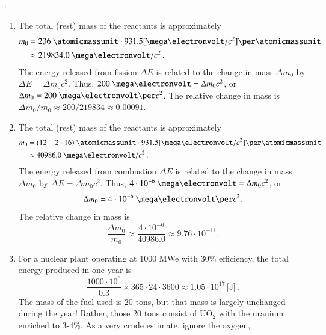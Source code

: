 \vspace{0.5cm}
\ifsolved
{
\color{purple}

:

\begin{enumerate}[label=(\alph*)]
\item The total (rest) mass of the reactants is approximately
      \begin{equation*}
      \begin{aligned}
       m_0
       &=236~\atomicmassunit\cdot
         931.5 [\mega\electronvolt/c^2]\per\atomicmassunit\\
       &\approx219834.0~\mega\electronvolt/c^2 \, .
      \end{aligned}
      \end{equation*}
       The energy released from fission $\Delta E$ is related to the change in mass $\Delta m_0$ by $\Delta E = \Delta m_0 c^2$.  Thus, $200~\mega\electronvolt = \Delta m_0 c^2$, or $\Delta m_0 = 200~ \mega\electronvolt\per c^2$.  The relative change in mass is $\Delta m_0 / m_0 \approx 200/219834 \approx \boxed{0.00091}$.
\item  The total (rest) mass of the reactants is approximately
      \begin{equation*}
      \begin{aligned}
       m_0
       &=(12+2\cdot16)~\atomicmassunit\cdot
         931.5 [\mega\electronvolt/c^2]\per\atomicmassunit\\
       &\approx40986.0~\mega\electronvolt/c^2 \, .
      \end{aligned}
      \end{equation*}
       The energy released from combustion $\Delta E$ is related to the change
       in mass $\Delta m_0$ by $\Delta E=\Delta m_0c^2$. Thus,
       $4\cdot10^{-6}~\mega\electronvolt=\Delta m_0c^2$, or
       \[
        \Delta m_0=4\cdot10^{-6}~\mega\electronvolt\per c^2.
       \]
       The relative change in mass is
       \[
        \frac{\Delta m_0}{m_0}
        \approx\frac{4\cdot10^{-6}}{40986.0}
        \approx\boxed{9.76\cdot10^{-11}}.
       \]
\item  For a nuclear plant operating at 1000 MWe with 30\% efficiency, the
total energy produced in one year is
\[
  \frac{1000 \cdot 10^6}{0.3} \times 365\cdot 24 \cdot 3600 \approx 1.05\cdot 10^{17} \, \text{[J]} \, .
\]
The mass of the fuel used is 20 tons, but that mass is largely unchanged
during the year! Rather, those 20 tons consist of UO\(_2\) with the
uranium enriched to 3-4\%. As a very crude estimate, ignore the oxygen,

\end{enumerate}}
